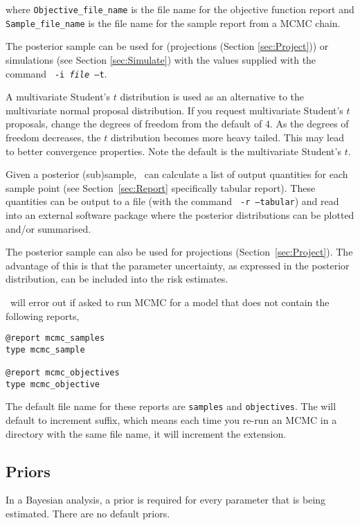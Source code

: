 where \texttt{Objective\_file\_name} is the file name for the objective function report and \texttt{Sample\_file\_name} is the file name for the sample report from a MCMC chain.

The posterior sample can be used for (projections (Section \ref{sec:Project})) or simulations (see Section \ref{sec:Simulate}) with the values supplied with the command \texttt{\cname\ -i \emph{file} --t}.

A multivariate Student's $t$ distribution is used as an alternative to the multivariate normal proposal distribution. If you request multivariate Student's $t$ proposals, change the degrees of freedom from the default of 4. As the degrees of freedom decreases, the $t$ distribution becomes more heavy tailed. This may lead to better convergence properties. Note the default is the multivariate Student's $t$.

Given a posterior (sub)sample, \CNAME\ can calculate a list of output quantities for each sample point (see Section~\ref{sec:Report} specifically tabular report). These quantities can be output to a file (with the command \texttt{\cname\ -r --tabular}) and read into an external software package where the posterior distributions can be plotted and/or summarised.

The posterior sample can also be used for projections (Section~\ref{sec:Project}). The advantage of this is that the parameter uncertainty, as expressed in the posterior distribution, can be included into the risk estimates.

\CNAME\ will error out if asked to run MCMC for a model that does not contain the following reports,
{\small{\begin{verbatim}
@report mcmc_samples
type mcmc_sample

@report mcmc_objectives
type mcmc_objective
\end{verbatim}}}

The default file name for these reports are \texttt{samples} and \texttt{objectives}. The  will default to increment suffix, which means each time you re-run an MCMC in a directory with the same file name, it will increment the extension.

\subsection{Priors\label{sec:Priors}}

In a Bayesian analysis, a prior is required for every parameter that is being estimated. There are no default priors.

